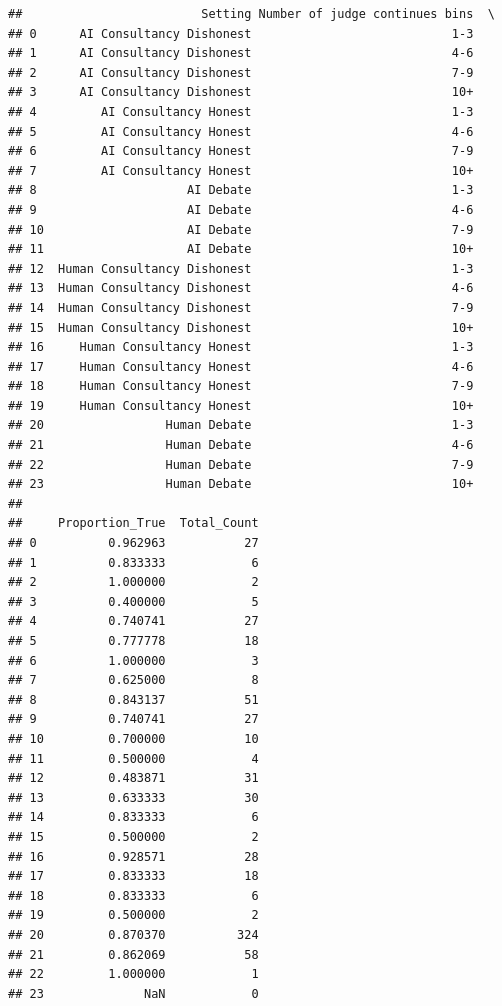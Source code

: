 \documentclass[
]{article}
\begin{document}
\begin{verbatim}
##                         Setting Number of judge continues bins  \
## 0      AI Consultancy Dishonest                            1-3   
## 1      AI Consultancy Dishonest                            4-6   
## 2      AI Consultancy Dishonest                            7-9   
## 3      AI Consultancy Dishonest                            10+   
## 4         AI Consultancy Honest                            1-3   
## 5         AI Consultancy Honest                            4-6   
## 6         AI Consultancy Honest                            7-9   
## 7         AI Consultancy Honest                            10+   
## 8                     AI Debate                            1-3   
## 9                     AI Debate                            4-6   
## 10                    AI Debate                            7-9   
## 11                    AI Debate                            10+   
## 12  Human Consultancy Dishonest                            1-3   
## 13  Human Consultancy Dishonest                            4-6   
## 14  Human Consultancy Dishonest                            7-9   
## 15  Human Consultancy Dishonest                            10+   
## 16     Human Consultancy Honest                            1-3   
## 17     Human Consultancy Honest                            4-6   
## 18     Human Consultancy Honest                            7-9   
## 19     Human Consultancy Honest                            10+   
## 20                 Human Debate                            1-3   
## 21                 Human Debate                            4-6   
## 22                 Human Debate                            7-9   
## 23                 Human Debate                            10+   
## 
##     Proportion_True  Total_Count  
## 0          0.962963           27  
## 1          0.833333            6  
## 2          1.000000            2  
## 3          0.400000            5  
## 4          0.740741           27  
## 5          0.777778           18  
## 6          1.000000            3  
## 7          0.625000            8  
## 8          0.843137           51  
## 9          0.740741           27  
## 10         0.700000           10  
## 11         0.500000            4  
## 12         0.483871           31  
## 13         0.633333           30  
## 14         0.833333            6  
## 15         0.500000            2  
## 16         0.928571           28  
## 17         0.833333           18  
## 18         0.833333            6  
## 19         0.500000            2  
## 20         0.870370          324  
## 21         0.862069           58  
## 22         1.000000            1  
## 23              NaN            0
\end{verbatim}
\end{document}
